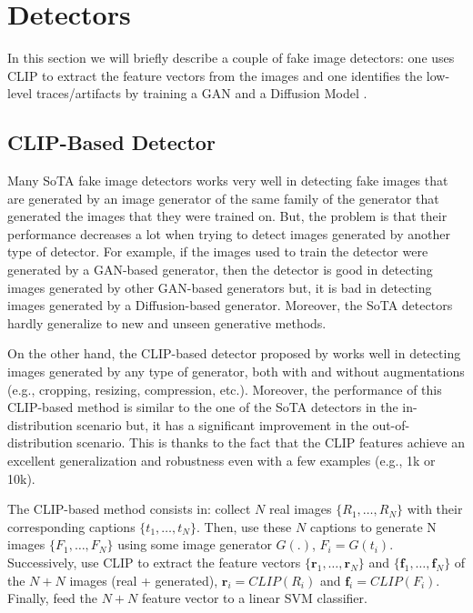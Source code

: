 \documentclass[conference]{IEEEtran} %
\begin{document}
\section{Detectors}

    In this section we will briefly describe a couple of fake image detectors: one uses CLIP to extract the feature vectors from the images \cite{cozzolino2024raising} and one identifies the low-level traces/artifacts by training a GAN and a Diffusion Model \cite{corvi2023detection}.

    \subsection{CLIP-Based Detector}
        Many SoTA fake image detectors works very well in detecting fake images that are generated by an image generator of the same family of the generator that generated the images that they were trained on. But, the problem is that their performance decreases a lot when trying to detect images generated by another type of detector. For example, if the images used to train the detector were generated by a GAN-based generator, then the detector is good in detecting images generated by other GAN-based generators but, it is bad in detecting images generated by a Diffusion-based generator. Moreover, the SoTA detectors hardly generalize to new and unseen generative methods.

        On the other hand, the CLIP-based detector proposed by \cite{cozzolino2024raising} works well in detecting images generated by any type of generator, both with and without augmentations (e.g., cropping, resizing, compression, etc.). Moreover, the performance of this CLIP-based method is similar to the one of the SoTA detectors in the in-distribution scenario but, it has a significant improvement in the out-of-distribution scenario. This is thanks to the fact that the CLIP features achieve an excellent generalization and robustness even with a few examples (e.g., 1k or 10k).

        The CLIP-based method consists in: collect $N$ real images $\{R_1,\dots,R_N\}$ with their corresponding captions $\{t_1,\dots,t_N\}$. Then, use these $N$ captions to generate N images $\{F_1,\dots,F_N\}$ using some image generator $G(.)$, $F_i = G(t_i)$. Successively, use CLIP to extract the feature vectors $\{\mathbf{r}_1,\dots,\mathbf{r}_N\}$ and $\{\mathbf{f}_1,\dots,\mathbf{f}_N\}$ of the $N + N$ images (real + generated), $\mathbf{r}_i = CLIP(R_i)$ and $\mathbf{f}_i = CLIP(F_i)$. Finally, feed the $N + N$ feature vector to a linear SVM classifier.
        
\end{document}

